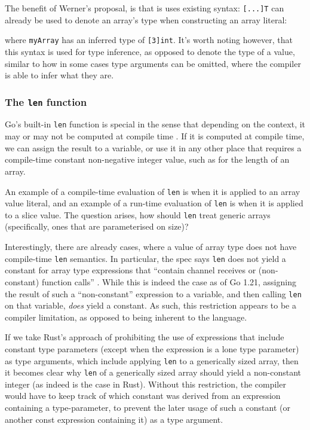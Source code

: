 The benefit of Werner's proposal, is that is uses existing syntax:
\texttt{[...]T} can already be used to denote an array's type when constructing
an array literal:


where \texttt{myArray} has an inferred type of \texttt{[3]int}. It's worth
noting however, that this syntax is used for type inference, as opposed to
denote the type of a value, similar to how in some cases type arguments can be
omitted, where the compiler is able to infer what they are.



\subsubsection{The \texttt{len} function}

Go's built-in \texttt{len} function is special in the sense that depending on
the context, it may or may not be computed at compile time \autocite{spec}. If
it is computed at compile time, we can assign the result to a 
variable, or use it in any other place that requires a compile-time constant
non-negative integer value, such as for the length of an array.

An example of a compile-time evaluation of \texttt{len} is when it is applied to
an array value literal, and an example of a run-time evaluation of \texttt{len}
is when it is applied to a slice value. The question arises, how should
\texttt{len} treat generic arrays (specifically, ones that are parameterised on
size)?

Interestingly, there are already cases, where a value of array type does not
have compile-time \texttt{len} semantics. In particular, the spec says
\texttt{len} does not yield a constant for array type expressions that ``contain
channel receives or (non-constant) function calls'' \autocite{spec}. While this
is indeed the case as of Go 1.21, assigning the result of such a
``non-constant'' expression to a variable, and then calling \texttt{len} on that
variable, \emph{does} yield a constant. As such, this restriction appears to be
a compiler limitation, as opposed to being inherent to the language.

If we take Rust's approach of prohibiting the use of expressions that include
constant type parameters (except when the expression is a lone type parameter)
as type arguments, which include applying \texttt{len} to a generically sized
array, then it becomes clear why \texttt{len} of a generically sized array
should yield a non-constant integer (as indeed is the case in Rust). Without
this restriction, the compiler would have to keep track of which constant was
derived from an expression containing a type-parameter, to prevent the later
usage of such a constant (or another const expression containing it) as a type
argument.


